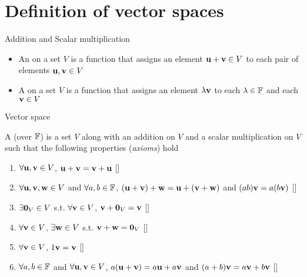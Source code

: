 \documentclass[aspectratio=169]{beamer}
\begin{document}
\section{Definition of vector spaces}

\begin{frame}{Addition and Scalar multiplication}
\begin{definition}
\begin{itemize}
\item An  on a set $V$ is a function that assigns an element $\mathbf{u}+\mathbf{v}\in V$ to each pair of elements $\mathbf{u},\mathbf{v}\in V$
\item  A  on a set $V$ is a function that assigns an element $\lambda \mathbf{v}$ to each $\lambda\in\mathbb{F}$ and each $\mathbf{v}\in V$
\end{itemize}
\end{definition}
\end{frame}

\begin{frame}{Vector space}
\begin{definition}
A  (over $\mathbb{F}$) is a set $V$ along with an addition on $V$ and a scalar multiplication on $V$ such that the following properties (\emph{axioms}) hold
\begin{enumerate}
\item $\forall \mathbf{u},\mathbf{v}\in V$, $\mathbf{u}+\mathbf{v}=\mathbf{v}+\mathbf{u}$  \hfill[]
\item $\forall \mathbf{u},\mathbf{v},\mathbf{w}\in V$ and $\forall a,b\in\mathbb{F}$, $(\mathbf{u}+\mathbf{v})+\mathbf{w}=\mathbf{u}+(\mathbf{v}+\mathbf{w})$ and $(ab)\mathbf{v}=a(b\mathbf{v})$ 
\newline\mbox{}\hfill[]
\item $\exists \b0_V\in V$ s.t. $\forall \mathbf{v}\in V$, $\bv+\b0_V=\bv$
\hfill[]
\item $\forall \mathbf{v}\in V$, $\exists \mathbf{w}\in V$ s.t. $\bv+\bw=\b0_V$
\hfill[]
\item $\forall \mathbf{v}\in V$, $1\mathbf{v}=\mathbf{v}$
\hfill[]
\item $\forall a,b\in\mathbb{F}$ and $\forall \mathbf{u},\mathbf{v}\in V$, 
$a(\mathbf{u}+\mathbf{v})=a\mathbf{u}+a\mathbf{v}$ and $(a+b)\mathbf{v}=a\mathbf{v}+b\mathbf{v}$ \newline\mbox{}
\hfill[]
\end{enumerate}
\end{definition}
\end{frame}
\end{document}
